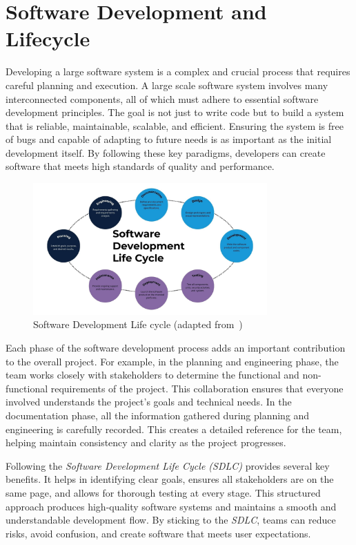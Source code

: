 \section{Software Development and Lifecycle}

Developing a large software system is a complex and crucial process that requires careful planning and execution. A large scale software system involves many interconnected components, all of which must adhere to essential software development principles. The goal is not just to write code but to build a system that is reliable, maintainable, scalable, and efficient. Ensuring the system is free of bugs and capable of adapting to future needs is as important as the initial development itself. By following these key paradigms, developers can create software that meets high standards of quality and performance.

\begin{figure}[H]
    \centering
    \includegraphics[width=0.8\textwidth]{figures/software_development.png}
    \caption[Software Development Life cycle]{Software Development Life cycle (adapted from~\citep{sire_sdlc_2024})}
	\label{fig_background_sd}
\end{figure}

Each phase of the software development process adds an important contribution to the overall project. For example, in the planning and engineering phase, the team works closely with stakeholders to determine the functional and non-functional requirements of the project. This collaboration ensures that everyone involved understands the project's goals and technical needs. In the documentation phase, all the information gathered during planning and engineering is carefully recorded. This creates a detailed reference for the team, helping maintain consistency and clarity as the project progresses.

Following the \textit{Software Development Life Cycle (SDLC)} provides several key benefits. It helps in identifying clear goals, ensures all stakeholders are on the same page, and allows for thorough testing at every stage. This structured approach produces high-quality software systems and maintains a smooth and understandable development flow. By sticking to the \textit{SDLC}, teams can reduce risks, avoid confusion, and create software that meets user expectations.

